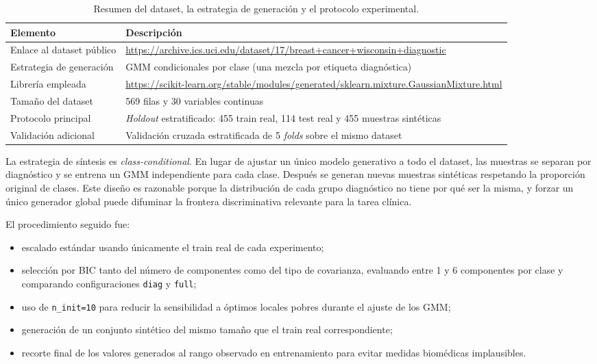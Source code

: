 \documentclass[11pt,a4paper]{article}
\begin{document}
\begin{table}[H]
\centering
\renewcommand{\arraystretch}{1.2}
\begin{tabular}{>{\raggedright\arraybackslash}p{4.9cm} p{9.6cm}}
\toprule
\textbf{Elemento} & \textbf{Descripción} \\
\midrule
Enlace al dataset público & \url{https://archive.ics.uci.edu/dataset/17/breast+cancer+wisconsin+diagnostic} \\
Estrategia de generación & GMM condicionales por clase (una mezcla por etiqueta diagnóstica) \\
Librería empleada & \url{https://scikit-learn.org/stable/modules/generated/sklearn.mixture.GaussianMixture.html} \\
Tamaño del dataset & 569 filas y 30 variables continuas \\
Protocolo principal & \textit{Holdout} estratificado: 455 train real, 114 test real y 455 muestras sintéticas \\
Validación adicional & Validación cruzada estratificada de 5 \textit{folds} sobre el mismo dataset \\
\bottomrule
\end{tabular}
\caption{Resumen del dataset, la estrategia de generación y el protocolo experimental.}
\end{table}

La estrategia de síntesis es \textit{class-conditional}. En lugar de ajustar un único modelo generativo a todo el dataset, las muestras se separan por diagnóstico y se entrena un GMM independiente para cada clase. Después se generan nuevas muestras sintéticas respetando la proporción original de clases. Este diseño es razonable porque la distribución de cada grupo diagnóstico no tiene por qué ser la misma, y forzar un único generador global puede difuminar la frontera discriminativa relevante para la tarea clínica.

El procedimiento seguido fue:
\begin{itemize}[leftmargin=1.1cm]
    \item escalado estándar usando únicamente el train real de cada experimento;
    \item selección por BIC tanto del número de componentes como del tipo de covarianza, evaluando entre 1 y 6 componentes por clase y comparando configuraciones \texttt{diag} y \texttt{full};
    \item uso de \texttt{n\_init=10} para reducir la sensibilidad a óptimos locales pobres durante el ajuste de los GMM;
    \item generación de un conjunto sintético del mismo tamaño que el train real correspondiente;
    \item recorte final de los valores generados al rango observado en entrenamiento para evitar medidas biomédicas implausibles.
\end{itemize}
\end{document}
